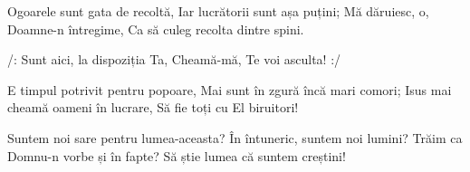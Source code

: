 \beginverse
Ogoarele sunt gata de recoltă,
Iar lucrătorii sunt așa puțini;
Mă dăruiesc, o, Doamne-n întregime,
Ca să culeg recolta dintre spini.
\endverse

\beginchorus
/: Sunt aici, la dispoziția Ta,
Cheamă-mă, Te voi asculta! :/
\endchorus

\beginverse
E timpul potrivit pentru popoare,
Mai sunt în zgură încă mari comori;
Isus mai cheamă oameni în lucrare,
Să fie toți cu El biruitori!
\endverse

\beginverse
Suntem noi sare pentru lumea-aceasta?
În întuneric, suntem noi lumini?
Trăim ca Domnu-n vorbe și în fapte?
Să știe lumea că suntem creștini!
\endverse
\endsong